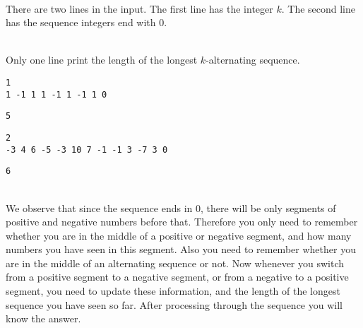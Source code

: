 \documentclass[12pt,psfig,epsf]{article}
\begin{document}
\vspace*{.3in} \\

There are two lines in the input. The first line has the integer $k$. The second line has the sequence integers end with $0$.

\vspace*{.3in} \\

Only one line print the length of the longest $k$-alternating sequence.

\vspace*{.3in}  
\begin{verbatim}
1
1 -1 1 1 -1 1 -1 1 0
\end{verbatim}

\vspace*{.3in}  
\begin{verbatim}
5
\end{verbatim}

\vspace*{.3in} 
\begin{verbatim}
2
-3 4 6 -5 -3 10 7 -1 -1 3 -7 3 0
\end{verbatim}

\vspace*{.3in}  
\begin{verbatim}
6
\end{verbatim}

\vspace*{.3in} \\

We observe that since the sequence ends in $0$, there will be only segments of positive and negative numbers before that. Therefore you only need to remember whether you are in the middle of a positive or negative segment, and how many numbers you have seen in this segment. Also you need to remember whether you are in the middle of an alternating sequence or not. Now whenever you switch from a positive segment to a negative segment, or from a negative to a positive segment, you need to update these information, and the length of the longest sequence you have seen so far. After processing through the sequence you will know the answer.
\end{document}
